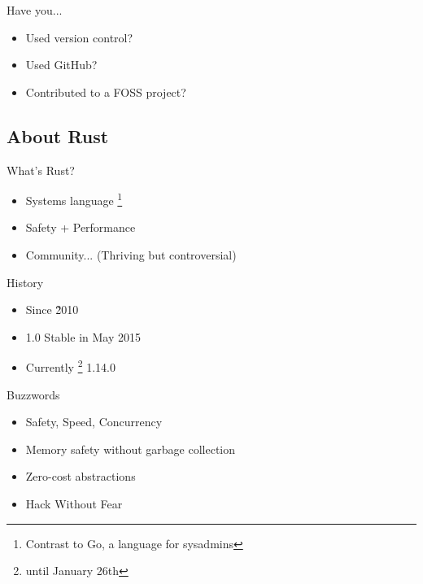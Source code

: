 \documentclass[xcolor={svgnames},hyperref]{beamer}
\begin{document}
    \begin{frame}
        Have you...
        \begin{itemize}
            \item Used version control?
            \item Used GitHub?
            \item Contributed to a FOSS project?
        \end{itemize}
    \end{frame}



    \subsection{About Rust}

    \begin{frame}
        What's Rust?
        \begin{itemize}
            \item Systems language \footnote{Contrast to Go, a language for sysadmins}
            \item Safety + Performance
            \item Community... (Thriving but controversial)
        \end{itemize}
    \end{frame}

    \begin{frame}
        History
        \begin{itemize}
            \item Since \~2010
            \item 1.0 Stable in May 2015
            \item Currently \footnote{until January 26th} 1.14.0
        \end{itemize}
    \end{frame}

     \begin{frame}
        Buzzwords
        \begin{itemize}
            \item Safety, Speed, Concurrency
            \item Memory safety without garbage collection
            \item Zero-cost abstractions
            \item Hack Without Fear
        \end{itemize}
    \end{frame}
\end{document}
